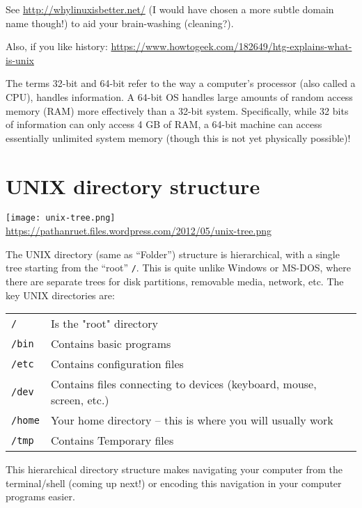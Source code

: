 See \url{http://whylinuxisbetter.net/} (I would have chosen a more 
subtle domain name though!) to aid your brain-washing (cleaning?).

Also, if you like history: {\sloppy \url{https://www.howtogeek.com/182649/htg-explains-what-is-unix}}

\begin{tipbox}
The terms 32-bit and 64-bit refer to the way a computer's processor (also called a CPU), handles information. A 64-bit OS handles large amounts of random access memory (RAM) more effectively than a 32-bit system. Specifically, while 32 bits of information can only access 4 GB of RAM, a 64-bit machine can access essentially unlimited system memory (though this is not yet physically possible)!  
\end{tipbox}  

\section{UNIX directory structure}

\begin{center}
  \texttt{[image: unix-tree.png]}\\
  \url{ https://pathanruet.files.wordpress.com/2012/05/unix-tree.png}	
\end{center}

The UNIX directory (same as ``Folder'') structure is hierarchical, with 
a single tree starting from the ``root'' {\tt /}. This is quite unlike 
Windows or MS-DOS, where there are separate trees for disk partitions, 
removable media, network, etc. The key UNIX directories are:
 
\begin{tabular}{p{2cm} p{10cm}} 
 {\tt /} & Is the "root" directory\\
 {\tt /bin} & Contains basic programs\\
 {\tt /etc} & Contains configuration files\\
 {\tt /dev} & Contains files connecting to devices (keyboard,
  mouse, screen, etc.)\\
 {\tt /home} & Your home directory -- this is where you will usually work\\
 {\tt /tmp} & Contains Temporary files\\
\end{tabular}

This hierarchical directory structure makes navigating your 
computer from the terminal/shell (coming up next!) or encoding this 
navigation in your computer programs easier. 

